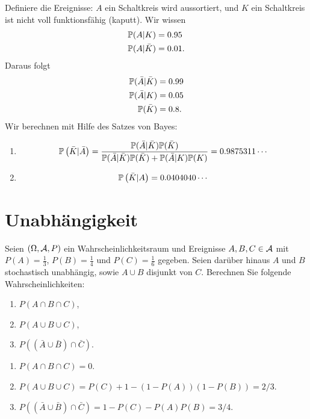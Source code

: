 \solution 
Definiere die Ereignisse: $A$ ein Schaltkreis wird aussortiert, und $K$ ein Schaltkreis ist
nicht voll funktionsfähig (kaputt). Wir wissen
\begin{align*}
    \mathbb P( A | K ) &= 0.95 \\
    \mathbb P( A | \bar K ) &= 0.01.
\end{align*}
Daraus folgt
\begin{align*}
    \mathbb P( \bar A | \bar K ) &= 0.99 \\
    \mathbb P( \bar A | K ) &= 0.05 \\
    \mathbb P( \bar K ) &= 0.8.
\end{align*}
Wir berechnen mit Hilfe des Satzes von Bayes:
\begin{enumerate}
    \item \begin{equation*}
            \mathbb P\left( \bar K | \bar A \right) = \frac{\mathbb P(\bar A | \bar K)\mathbb P(\bar K)}
            {\mathbb P(\bar A | \bar K)\mathbb P(\bar K) + \mathbb P(\bar A | K ) \mathbb P(K)} = 0.9875311\cdots
        \end{equation*}
    \item \begin{equation*}
            \mathbb P\left( \bar K | A \right) = 0.0404040\cdots
        \end{equation*}
\end{enumerate}


\section{Unabhängigkeit}

Seien $(\Omega, \mathcal A, P)$ ein Wahrscheinlichkeitsraum und Ereignisse $A, B, C
\in \mathcal A$ mit $P(A)=\frac{1}{3}$, $P(B)=\frac{1}{4}$ und $P(C)=\frac{1}{6}$
gegeben. Seien darüber hinaus $A$ und $B$ stochastisch unabhängig, sowie $A\cup B$ 
disjunkt von $C$. Berechnen Sie folgende Wahrscheinlichkeiten:
\begin{enumerate}
    \item $P(A \cap B \cap C)$,
    \item $P(A \cup B \cup C)$,
    \item $P( ( \bar A \cup \bar B) \cap \bar C )$.
\end{enumerate}

\solution
\begin{enumerate}
    \item $P(A \cap B \cap C) = 0$.
    \item $P(A \cup B \cup C) = P(C) + 1 - (1 - P(A))(1-P(B)) = 2/3$.
    \item $P( ( \bar A \cup \bar B) \cap \bar C ) = 1 - P(C) - P(A)P(B) = 3/4$.
\end{enumerate}

